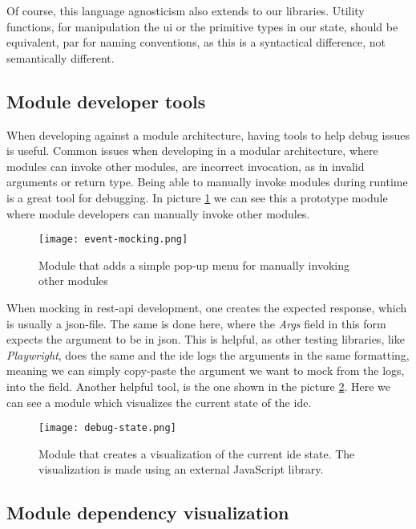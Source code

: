 Of course, this language agnosticism also extends to our libraries. Utility
functions, for manipulation the \gls*{ui} or the primitive types in our state,
should be equivalent, par for naming conventions, as this is a syntactical
difference, not semantically different.


\subsection{Module developer tools}

When developing against a module architecture, having tools to help debug issues
is useful. Common issues when developing in a modular architecture, where
modules can invoke other modules, are incorrect invocation, as in invalid
arguments or return type. Being able to manually invoke modules during runtime
is a great tool for debugging. In picture \ref{pic:eventMock} we can see this a
prototype module where module developers can manually invoke other modules.

\begin{figure}[H]
  \centering
  \texttt{[image: event-mocking.png]}
  \caption{
    Module that adds a simple pop-up menu for manually invoking other modules
  }
  \label{pic:eventMock}
\end{figure}

When mocking in \gls*{rest}-\gls*{api} development, one creates the expected
response, which is usually a \gls*{json}-file. The same is done here, where the
\textit{Args} field in this form expects the argument to be in \gls*{json}. This
is helpful, as other testing libraries, like \textit{Playwright}, does the same
and the \gls*{ide} logs the arguments in the same formatting, meaning we
can simply copy-paste the argument we want to mock from the logs, into the
field. Another helpful tool, is the one shown in the picture
\ref{pic:debugState}. Here we can see a module which visualizes the current
state of the \gls*{ide}.

\begin{figure}[H]
  \centering
  \texttt{[image: debug-state.png]}
  \caption{
    Module that creates a visualization of the current \gls*{ide} state. The
    visualization is made using an external JavaScript library.
  }
  \label{pic:debugState}
\end{figure}


\subsection{Module dependency visualization} \label{ssec:mdv}

